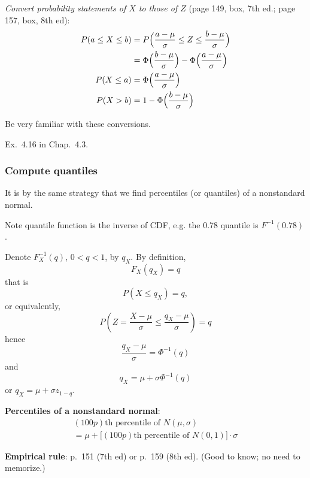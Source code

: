 \documentclass[12pt]{article}
\begin{document}


\emph{Convert probability statements of $X$ to those of $Z$} (page 149,
box, 7th ed.; page 157, box, 8th ed):
\[\begin{split}
P(a \le X \le b)
&= P\Bigl(\frac{a-\mu}{\sigma} \le Z \le \frac{b-\mu}{\sigma}\Bigr)
\\
&= \Phi\Bigl(\frac{b-\mu}{\sigma}\Bigr) - \Phi\Bigl(\frac{a-\mu}{\sigma}\Bigr)
\\
P(X \le a)
&= \Phi\Bigl(\frac{a-\mu}{\sigma}\Bigr)
\\
P(X > b)
&= 1- \Phi\Bigl(\frac{b-\mu}{\sigma}\Bigr)
\end{split}
\]

\alert
Be very familiar with these conversions.

\example Ex.~4.16 in Chap.~4.3.

\subsubsection{Compute quantiles}

It is by the same strategy that we find percentiles (or
quantiles) of a nonstandard normal.

Note quantile function is the inverse of CDF, e.g.\@
the 0.78 quantile is $F^{-1}(0.78)$.

Denote $F^{-1}_X(q)$, $0<q<1$, by $q_X$.
By definition,
\[
F_X(q_X) = q
\]
that is
\[
P(X \le q_X) = q,
\]
or equivalently,
\[
P\left(Z = \frac{X-\mu}{\sigma} \le \frac{q_X - \mu}{\sigma}\right)
= q
\]
hence
\[
\frac{q_X - \mu}{\sigma} = \Phi^{-1}(q)
\]
and
\[
q_X = \mu + \sigma \Phi^{-1}(q)
\]
or
$q_X = \mu + \sigma z_{1-q}$.

\textbf{Percentiles of a nonstandard normal}:
\begin{multline*}
(100p)\text{th percentile of $N(\mu,\sigma)$}\\
= \mu + \bigl[(100p)\text{th percentile of $N(0,1)$}\bigr] \cdot \sigma
\end{multline*}

\textbf{Empirical rule}: p.~151 (7th ed) or p.~159 (8th ed).
(Good to know; no need to memorize.)
\end{document}
